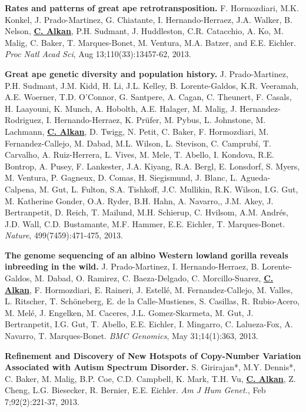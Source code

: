 \documentclass[margin,line]{res}
\begin{document}
\begin{resume}
 \vspace{-.2cm}        
        {\bf Rates and patterns of great ape retrotransposition.}
        F. Hormozdiari, M.K. Konkel, J. Prado-Martinez, G. Chiatante, I. Hernando-Herraez, J.A. Walker, B. Nelson, {\bf {\underline {C. Alkan}}}, P.H. Sudmant, J. Huddleston, C.R. Catacchio, A. Ko, 
        M. Malig, C. Baker, T. Marques-Bonet, M. Ventura, M.A. Batzer, and E.E. Eichler. 
        {\em Proc Natl Acad Sci}, Aug 13;110(33):13457-62, 2013.
                             

 \vspace{-.2cm}
        {\bf Great ape genetic diversity and population history.}
        J. Prado-Martinez, P.H. Sudmant, J.M. Kidd, H. Li, J.L. Kelley, B. Lorente-Galdos, K.R. Veeramah, A.E. Woerner, T.D. O’Connor, G. Santpere, A. Cagan, C. Theunert, F. Casals, H. Laayouni, K. Munch, A. Hobolth, A.E. Halager, M. Malig, J. Hernandez-Rodriguez, I. Hernando-Herraez, K. Prüfer, M. Pybus, L. Johnstone, M. Lachmann, {\bf {\underline {C. Alkan}}}, D. Twigg, N. Petit, C. Baker, F. Hormozdiari, M. Fernandez-Callejo, M. Dabad, M.L. Wilson, L. Stevison, C. Camprubí, T. Carvalho, A. Ruiz-Herrera, L. Vives, M. Mele, T. Abello, I. Kondova, R.E. Bontrop, A. Pusey, F. Lankester, J.A. Kiyang, R.A. Bergl, E. Lonsdorf, S. Myers, M. Ventura, P. Gagneux, D. Comas, H. Siegismund, J. Blanc, L. Agueda-Calpena, M. Gut, L. Fulton, S.A. Tishkoff, J.C. Mullikin, R.K. Wilson, I.G. Gut, M. Katherine Gonder, O.A. Ryder, B.H. Hahn, A. Navarro,, J.M. Akey, J. Bertranpetit, D. Reich, T. Mailund, M.H. Schierup, C. Hvilsom, A.M. Andrés, J.D. Wall, C.D. Bustamante, M.F. Hammer, E.E. Eichler, T. Marques-Bonet. 
        {\em Nature}, 499(7459):471-475, 2013.


 \vspace{-.2cm}
        {\bf The genome sequencing of an albino Western lowland gorilla reveals inbreeding in the wild.}
        J. Prado-Martinez, I. Hernando-Herraez, B. Lorente-Galdos, M. Dabad, O. Ramirez, C. Baeza-Delgado, C. Morcillo-Suarez, 
        {\bf {\underline {C. Alkan}}}, F. Hormozdiari, E. Raineri, J. Estellé, M. Fernandez-Callejo, M. Valles, L. Ritscher, T. Schöneberg, E. de la Calle-Mustienes, 
        S. Casillas, R. Rubio-Acero, M. Melé, J. Engelken, M. Caceres, J.L. Gomez-Skarmeta, M. Gut, J. Bertranpetit, I.G. Gut, T. Abello, 
        E.E. Eichler, I. Mingarro, C. Lalueza-Fox, A. Navarro, T. Marques-Bonet.
        {\em BMC Genomics}, May 31;14(1):363, 2013.

 \vspace{-.2cm}
        {\bf Refinement and Discovery of New Hotspots of Copy-Number Variation Associated with Autism Spectrum Disorder.}
        S. Girirajan*, M.Y. Dennis*, C. Baker, M. Malig, B.P. Coe, C.D. Campbell, K. Mark, T.H. Vu,
        {\bf {\underline {C. Alkan}}}, Z. Cheng, L.G. Biesecker, R. Bernier, E.E. Eichler.
        {\em Am J Hum Genet.}, Feb 7;92(2):221-37, 2013.


\end{resume}
\end{document}
